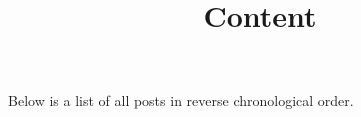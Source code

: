\documentclass{page}
\title{Content}
\begin{document}
Below is a list of all posts in reverse chronological order.

\postlist
\end{document}
